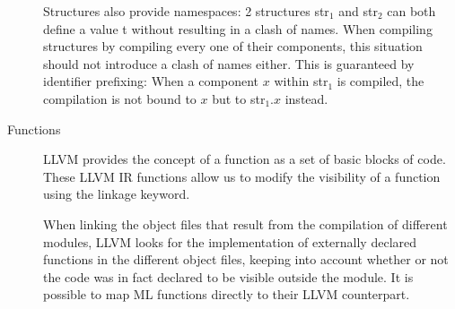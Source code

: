 \begin{description}
Structures also provide namespaces: 2 structures str$_{1}$ and str$_{2}$ can both define a value t without resulting in a clash of names.
When compiling structures by compiling every one of their components, this situation should not introduce a clash of names either.
This is guaranteed by identifier prefixing: When a component $x$ within str$_{1}$ is compiled, the compilation is not bound to $x$ but to str$_{1}.x$ instead.






\item[Functions]
LLVM provides the concept of a function as a set of basic blocks of code. 
These LLVM IR functions allow us to modify the visibility of a function using the linkage keyword. 

When linking the object files that result from the compilation of different modules, LLVM looks for the implementation of externally declared functions in the different object files, keeping into account whether or not the code was in fact declared to be visible outside the module. It is possible to map ML functions directly to their LLVM counterpart.


\end{description}
